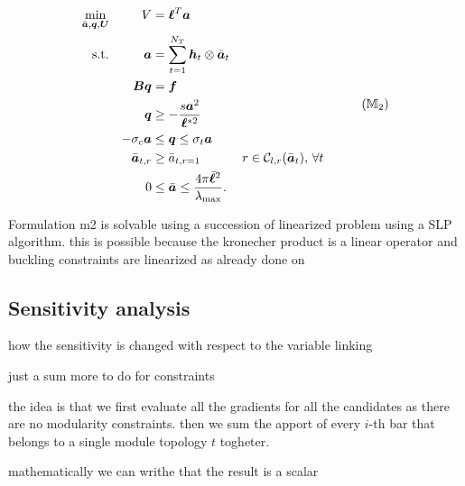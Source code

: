 \begin{equation}
    \begin{aligned}
    \min_{\bar{\vect{a}}, \vect{q}, \vect{U}}   && V &= \vect{\ell}^{T}\vect{a}\\
    \textrm{s.t.}  && \vect{a} &= \sum_{t=1}^{N_T} \vect{h}_t\otimes\bar{\vect{a}}_t \\ 
    && \matr{B}\vect{q} &= \vect{f} && \\
    && \vect{q} &\geq -\frac{s\vect{a}^2}{\vect{\ell}^{*2}} &&  \\
    && -\sigma_c\vect{a} &\leq \vect{q} \leq \sigma_t\vect{a} &&  \\
    && \bar{\vect{a}}_{t,r}&\geq \bar{a}_{t,r=1} && r \in \mathcal{C}_{l,r}(\bar{\vect{a}}_t),\, \forall t \\
    && 0 &\leq \bar{\vect{a}} \leq \frac{4 \pi \bar{\vect{\ell}}^2}{\lambda_{\text{max}}}. \\
    \end{aligned}
    \tag{${\mathbb{M}}_\text{2}$}
    \label{eq:05_optim_no_constr_modular}
\end{equation}

Formulation m2 is solvable using a succession of linearized problem using a SLP algorithm. this is possible because the kronecher product is a linear operator and buckling constraints are linearized as already done on 

\subsection{Sensitivity analysis}
how the sensitivity is changed with respect to the variable linking

just a sum more to do for constraints

the idea is that we first evaluate all the gradients for all the candidates as there are no modularity constraints. then we sum the apport of every $i$-th bar that belongs to a single module topology $t$ togheter.

mathematically we can writhe that  the result is a scalar


